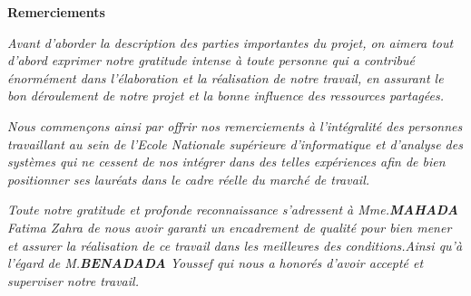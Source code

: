 \documentclass[a4paper]{report}
\begin{document}
 \setcounter{page}{1}
\begin{doublespace}
\begin{center}
\vspace*{1cm}

\textbf{\huge{Remerciements}}

\end{center}
\end{doublespace}
\begin{doublespace}
\begin{center}

\textit{Avant d'aborder la description des parties importantes du projet, on aimera tout d’abord exprimer notre gratitude intense à toute personne qui a contribué  énormément dans l'élaboration et la réalisation de notre travail, en assurant le bon déroulement de notre projet et la bonne influence des ressources partagées.}

\textit{Nous commençons ainsi par offrir nos remerciements à l'intégralité des personnes travaillant au sein de l’Ecole Nationale supérieure d’informatique et d’analyse des systèmes qui ne cessent de nos intégrer dans des telles expériences afin de bien positionner ses lauréats dans le cadre réelle du marché de travail.}

\textit{Toute notre gratitude et profonde reconnaissance s’adressent à  Mme.\textbf{MAHADA} Fatima Zahra  de nous avoir garanti un encadrement de qualité pour bien mener et assurer la réalisation de ce travail dans les meilleures des conditions.Ainsi qu'à l'égard de M.\textbf{BENADADA} Youssef qui nous a honorés d’avoir accepté et superviser notre travail.}

\end{center}

\end{doublespace}
\end{document}
